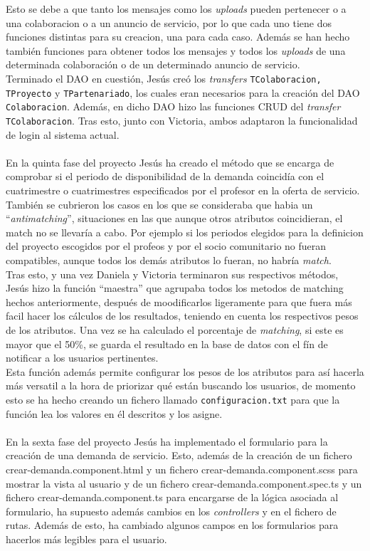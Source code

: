 \documentclass[11pt]{book}
\begin{document}
Esto se debe a que tanto los mensajes como los \emph{uploads} pueden pertenecer o a una colaboracion o a un anuncio de servicio, por lo que cada uno tiene dos funciones distintas para su creacion, una para cada caso. Además se han hecho también funciones para obtener todos los mensajes y todos los \emph{uploads} de una determinada colaboración o de un determinado anuncio de servicio.\\
Terminado el DAO en cuestión, Jesús creó los \emph{transfers} \texttt{TColaboracion, TProyecto} y \texttt{TPartenariado}, los cuales eran necesarios para la creación del DAO \texttt{Colaboracion}. Además, en dicho DAO hizo las funciones CRUD del \emph{transfer} \texttt{TColaboracion}. Tras esto, junto con Victoria, ambos adaptaron la funcionalidad de login al sistema actual.\\\\
En la quinta fase del proyecto Jesús ha creado el método que se encarga de comprobar si el periodo de disponibilidad de la demanda coincidía con el cuatrimestre o cuatrimestres especificados por el profesor en la oferta de servicio. También se cubrieron los casos en los que se consideraba que habia un ``\emph{antimatching}'', situaciones en las que aunque otros atributos coincidieran, el match no se llevaría a cabo. Por ejemplo si los periodos elegidos para la definicion del proyecto escogidos por el profeos y por el socio comunitario no fueran compatibles, aunque todos los demás atributos lo fueran, no habría \emph{match}.\\
Tras esto, y una vez Daniela y Victoria terminaron sus respectivos métodos, Jesús hizo la función ``maestra'' que agrupaba todos los metodos de matching hechos anteriormente, después de moodificarlos ligeramente para que fuera más facil hacer los cálculos de los resultados, teniendo en cuenta los respectivos pesos de los atributos. Una vez se ha calculado el porcentaje de \emph{matching}, si este es mayor que el 50\%, se guarda el resultado en la base de datos con el fín de notificar a los usuarios pertinentes.\\
Esta función además permite configurar los pesos de los atributos para así hacerla más versatil a la hora de priorizar qué están buscando los usuarios, de momento esto se ha hecho creando un fichero llamado \texttt{configuracion.txt} para que la función lea los valores en él descritos y los asigne.\\\\
En la sexta fase del proyecto Jesús ha implementado el formulario para la creación de una demanda de servicio. Esto, además de la creación de un fichero crear-demanda.component.html y un fichero crear-demanda.component.scss para mostrar la vista al usuario  y de un fichero crear-demanda.component.spec.ts
 y un fichero crear-demanda.component.ts para encargarse de la lógica asociada al formulario, ha supuesto además cambios en los \emph{controllers} y en el fichero de rutas. Además de esto, ha cambiado algunos campos en los formularios para hacerlos más legibles para el usuario.
\end{document}
